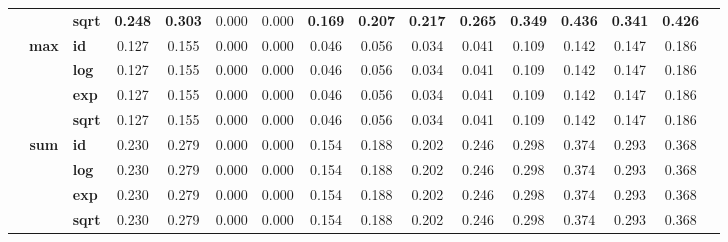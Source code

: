 \begin{table}[t]
{\begin{tabular}{cclccccccccccccc}
            & & \textbf{sqrt} & \textbf{0.248} & \textbf{0.303} & 0.000 & 0.000 & \textbf{0.169} & \textbf{0.207} & \textbf{0.217} & \textbf{0.265} & \textbf{0.349} & \textbf{0.436} & \textbf{0.341} & \textbf{0.426} \\
        \cmidrule{2-15}
        & \multirow{4}{*}{\textbf{max}}
            & \textbf{id}     & 0.127 & 0.155 & 0.000 & 0.000 & 0.046 & 0.056 & 0.034 & 0.041 & 0.109 & 0.142 & 0.147 & 0.186 \\
            & & \textbf{log}  & 0.127 & 0.155 & 0.000 & 0.000 & 0.046 & 0.056 & 0.034 & 0.041 & 0.109 & 0.142 & 0.147 & 0.186 \\
            & & \textbf{exp}  & 0.127 & 0.155 & 0.000 & 0.000 & 0.046 & 0.056 & 0.034 & 0.041 & 0.109 & 0.142 & 0.147 & 0.186 \\
            & & \textbf{sqrt} & 0.127 & 0.155 & 0.000 & 0.000 & 0.046 & 0.056 & 0.034 & 0.041 & 0.109 & 0.142 & 0.147 & 0.186 \\
        \cmidrule{2-15}
        & \multirow{4}{*}{\textbf{sum}}
            & \textbf{id}     & 0.230 & 0.279 & 0.000 & 0.000 & 0.154 & 0.188 & 0.202 & 0.246 & 0.298 & 0.374 & 0.293 & 0.368 \\
            & & \textbf{log}  & 0.230 & 0.279 & 0.000 & 0.000 & 0.154 & 0.188 & 0.202 & 0.246 & 0.298 & 0.374 & 0.293 & 0.368 \\
            & & \textbf{exp}  & 0.230 & 0.279 & 0.000 & 0.000 & 0.154 & 0.188 & 0.202 & 0.246 & 0.298 & 0.374 & 0.293 & 0.368 \\
            & & \textbf{sqrt} & 0.230 & 0.279 & 0.000 & 0.000 & 0.154 & 0.188 & 0.202 & 0.246 & 0.298 & 0.374 & 0.293 & 0.368 \\
        \midrule


\end{tabular}}
\end{table}
